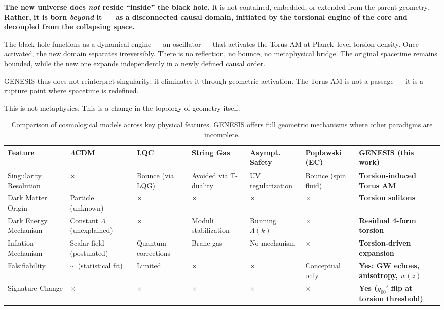 \documentclass{article}
\begin{document}
\textbf{The new universe does \emph{not} reside “inside” the black hole.}  
It is not contained, embedded, or extended from the parent geometry.  
\textbf{Rather, it is born \emph{beyond} it — as a disconnected causal domain, initiated by the torsional engine of the core and decoupled from the collapsing space.}  

The black hole functions as a dynamical engine — an oscillator — that activates the Torus AM at Planck–level torsion density. Once activated, the new domain separates irreversibly. There is no reflection, no bounce, no metaphysical bridge. The original spacetime remains bounded, while the new one expands independently in a newly defined causal order.

GENESIS thus does not reinterpret singularity; it eliminates it through geometric activation. The Torus AM is not a passage — it is a rupture point where spacetime is redefined.

This is not metaphysics. This is a change in the topology of geometry itself.


\begin{table}[ht]
\centering
\caption{Comparison of cosmological models across key physical features. GENESIS offers full geometric mechanisms where other paradigms are incomplete.}
\label{tab:model_comparison_vertical}
\begin{adjustbox}{max width=\textwidth}
\scriptsize
\renewcommand{\arraystretch}{1.4}
\begin{tabular}{|p{}|p{}|p{2.4cm}|p{2.3cm}|p{2.4cm}|p{2.4cm}|p{3.9cm}|}
\hline
\textbf{Feature} & \textbf{$\Lambda$CDM} & \textbf{LQC} & \textbf{String Gas} & \textbf{Asympt. Safety} & \textbf{Popławski (EC)} & \textbf{GENESIS (this work)} \\
\hline
Singularity Resolution & $\times$ & Bounce (via LQG) & Avoided via T-duality & UV regularization & Bounce (spin fluid) & \textbf{Torsion-induced Torus AM} \\
\hline
Dark Matter Origin & Particle (unknown) & $\times$ & $\times$ & $\times$ & $\times$ & \textbf{Torsion solitons} \\
\hline
Dark Energy Mechanism & Constant $\Lambda$ (unexplained) & $\times$ & Moduli stabilization & Running $\Lambda(k)$ & $\times$ & \textbf{Residual 4-form torsion} \\
\hline
Inflation Mechanism & Scalar field (postulated) & Quantum corrections & Brane-gas & No mechanism & $\times$ & \textbf{Torsion-driven expansion} \\
\hline
Falsifiability & $\sim$ (statistical fit) & Limited & $\times$ & $\times$ & Conceptual only & \textbf{Yes: GW echoes, anisotropy, $w(z)$} \\
\hline
Signature Change & $\times$ & $\times$ & $\times$ & $\times$ & $\times$ & \textbf{Yes ($g_{00}'$ flip at torsion threshold)} \\
\hline
\end{tabular}
\end{adjustbox}
\end{table}
\end{document}

